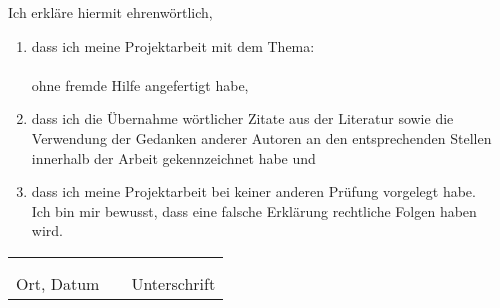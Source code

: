 Ich erkläre hiermit ehrenwörtlich,
\begin{flushleft}
\begin{enumerate}[leftmargin=0.5cm]
	\item 	dass ich meine Projektarbeit mit dem Thema:  \\
	\vspace*{1cm}
			\textbf{\CTITLE} \\
	\vspace*{1cm}
			ohne fremde Hilfe angefertigt habe, \\
	\item	dass ich die Übernahme wörtlicher Zitate aus der Literatur sowie die Verwendung der
			Gedanken anderer Autoren an den entsprechenden Stellen innerhalb der Arbeit gekennzeichnet habe und  \\
	\item	dass ich meine Projektarbeit bei keiner anderen Prüfung vorgelegt habe. \\
	\vspace*{1cm}
			Ich bin mir bewusst, dass eine falsche Erklärung rechtliche Folgen haben wird. \\
\end{enumerate}
\end{flushleft}
\vspace*{\fill}
\begin{tabular} {lrl}
	\hspace{5.5cm} & \hspace{3cm} & \hspace{5.5cm} \\
	\hrulefill & & \hrulefill \\
	Ort, Datum & & Unterschrift
\end{tabular}
\vspace*{\fill}

